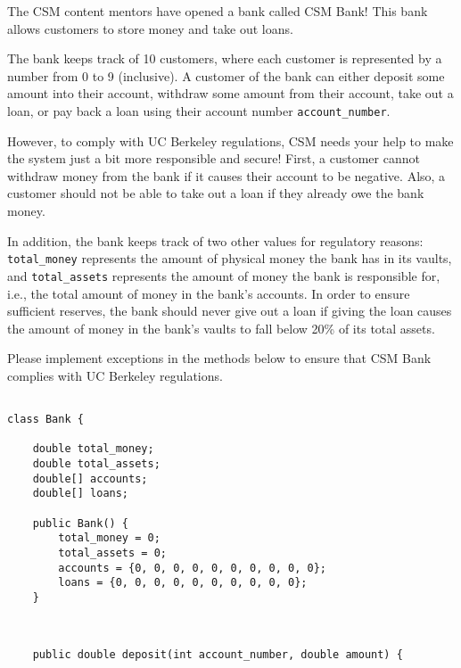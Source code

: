 \question
\begin{parts}

\item The CSM content mentors have opened a bank called CSM Bank! This bank allows customers to store money and take out loans.

The bank keeps track of 10 customers, where each customer is represented by a number from 0 to 9 (inclusive). A customer of the bank can either deposit some amount into their account, withdraw some amount from their account,
take out a loan, or pay back a loan using their account number \lstinline{account_number}.

However, to comply with UC Berkeley regulations, CSM needs your help to make the system just a bit more responsible and secure! 
First, a customer cannot withdraw money from the bank if it causes their account to be negative. Also, a customer should not be able to take out a loan if they already owe the bank money.

In addition, the bank keeps track of two other values for regulatory reasons: \lstinline{total_money} represents the amount of physical money the bank has in its vaults, 
and \lstinline{total_assets} represents the amount of money the bank is responsible for, i.e., the total amount of money in the bank's accounts.
In order to ensure sufficient reserves, the bank should never give out a loan if giving the loan causes the amount of money in the bank's vaults to fall below 20\% of its total assets.

Please implement exceptions in the methods below to ensure that CSM Bank complies with UC Berkeley regulations.

\ifprintanswers\else
\begin{lstlisting}

class Bank {

    double total_money;
    double total_assets;
    double[] accounts;
    double[] loans;
    
    public Bank() {
        total_money = 0;
        total_assets = 0;
        accounts = {0, 0, 0, 0, 0, 0, 0, 0, 0, 0};
        loans = {0, 0, 0, 0, 0, 0, 0, 0, 0, 0};
    }
    
\end{lstlisting}

\pagebreak
\begin{lstlisting}
 
    public double deposit(int account_number, double amount) {








\end{lstlisting}
\end{parts}
